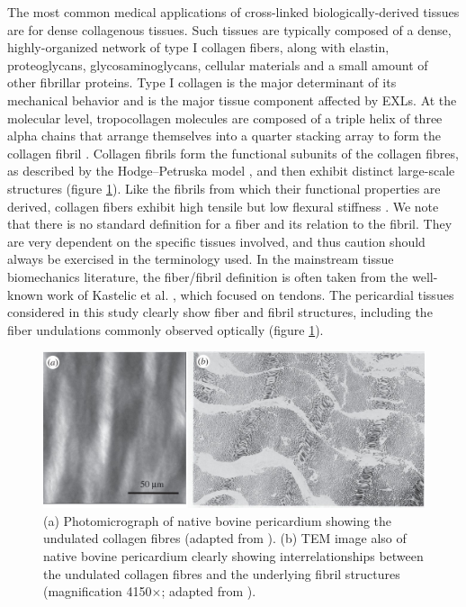     The most common medical applications of cross-linked biologically-derived tissues are for dense collagenous tissues. Such tissues are typically composed of a dense, highly-organized network of type I collagen fibers, along with elastin, proteoglycans, glycosaminoglycans, cellular materials and a small amount of other fibrillar proteins. Type I collagen is the major determinant of its mechanical behavior \cite{parry_molecular_1988,gelse_collagens_2003} and is the major tissue component affected by EXLs. At the molecular level, tropocollagen molecules are composed of a triple helix of three alpha chains \cite{parry_molecular_1988,gelse_collagens_2003} that arrange themselves into a quarter stacking array to form the collagen fibril \cite{parry_molecular_1988,gelse_collagens_2003}. Collagen fibrils form the functional subunits of the collagen fibres, as described by the Hodge–Petruska model \cite{parry_molecular_1988,petruska_subunit_1964}, and then exhibit distinct large-scale structures (figure \ref{c3:fig:1}). Like the fibrils from which their functional properties are derived, collagen fibers exhibit high tensile but low flexural stiffness \cite{sacks_biomechanics_2009}. We note that there is no standard definition for a fiber and its relation to the fibril. They are very dependent on the specific tissues involved, and thus caution should always be exercised in the terminology used. In the mainstream tissue biomechanics literature, the fiber/fibril definition is often taken from the well-known work of Kastelic et al. \cite{nimni_collagen_2018}, which focused on tendons. The pericardial tissues considered in this study clearly show fiber and fibril structures, including the fiber undulations commonly observed optically \cite{shen_stress_2008} (figure \ref{c3:fig:1}).
    
    
\begin{figure}
\centering
\includegraphics[width=\textwidth]{Images/chapter3/F1large.jpg}
\caption{(a) Photomicrograph of native bovine pericardium showing the undulated collagen fibres (adapted from \cite{sacks_incorporation_2003}). (b) TEM image also of native bovine pericardium clearly showing interrelationships between the undulated collagen fibres and the underlying fibril structures (magnification 4150$\times$; adapted from \cite{nimni_collagen_2018}).}
\label{c3:fig:1}
\end{figure}

